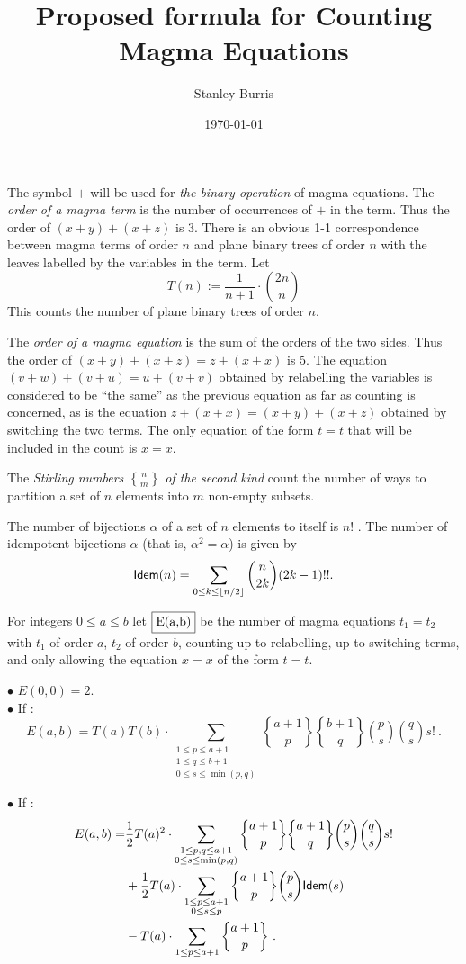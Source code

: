 \documentclass[12pt]{amsart}
\title{Proposed formula for Counting Magma Equations}
\author{Stanley Burris}
\date{\today}
\newcommand{\Idem}{{\sf Idem}}
\begin{document}
\maketitle

The symbol $+$ will be used for {\it the binary operation} of magma equations. The {\it order of a magma term} is the number of occurrences of $+$ in the term. Thus the order of $(x+y) + (x + z)$ is 3. There is an obvious 1-1 correspondence between magma terms of order $n$ and plane binary trees of order $n$ with the leaves labelled by the variables in the term. Let
$$
T(n) := \frac{1}{n+1} \cdot {2n \choose n}
$$
This counts the number of plane binary trees of order $n$.

The {\it order of a magma equation} is the sum of the orders of the two sides. Thus the order of $(x+y) +(x+z) = z + (x +x)$ is 5. 
The equation $(v+w) +(v+u) = u + (v +v)$ obtained by relabelling the variables is considered to be ``the same'' as the previous equation as far as counting is concerned, as is the equation 
$ z + (x +x) = (x+y) +(x+z) $
obtained by switching the two terms. The only equation of the form $t = t$ that will be included in the count is $x=x$.

The {\it Stirling numbers $n \brace m$ of the second kind} count the number of ways to partition a set of $n$ elements into $m$ non-empty subsets.

The number of bijections $\alpha$ of a set of $n$ elements to itself is $n!$ .
The number of idempotent bijections $\alpha$ (that is, $\alpha^2 = \alpha$) is given by
$$
\Idem(n) = \sum_{0 \leq k \leq \lfloor n/2 \rfloor}  {n\choose 2k} (2k-1)!!.
$$

For integers $0 \le a \le b$ let $\fbox{E(a,b)}$ be the number of magma equations $t_1 = t_2$ with $t_1$ of order $a$, $t_2$ of order $b$, counting up to relabelling, up to switching terms, and only allowing the equation $x=x$ of the form $t=t$. 

\pagebreak

$\bullet$ $E(0,0) = 2$.\\

$\bullet$ If : 
$$
E(a,b) = T(a)T(b)\cdot \sum_{\substack{1 \le p \le a+1\\ 1 \le q \le b+1\\0\le s \le \min(p,q)}} 
{a+1 \brace p} {b+1 \brace q} {p \choose s} {q \choose s} s! \ .
$$

$\bullet$ If : 
\begin{align*}
E(a,b) = &\frac{1}{2} T(a)^2\cdot \sum_{\substack{1 \le p,q \le a+1\\ 0\le s \le \min(p,q)}} 
{a+1 \brace p} {a+1 \brace q} {p \choose s} {q \choose s} s! \\
&+ \frac{1}{2} T(a) \cdot \sum_{\substack{1 \le p \le a+1\\ 0\le s \le p}} 
{a+1 \brace p}  {p \choose s}  \Idem(s)\\
&- T(a)\cdot \sum_{1\le p \le a+1}  {a+1 \brace p} \ .
\end{align*}
\end{document}
